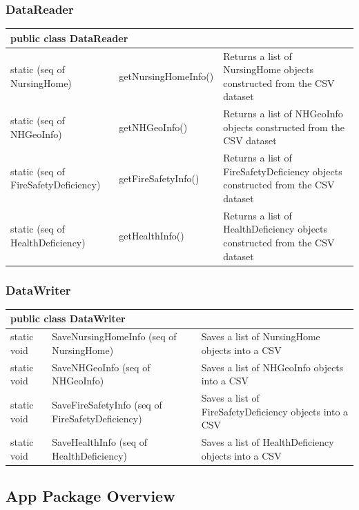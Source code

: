 \documentclass[12pt]{article}
\begin{document}
\newpage
\subsubsection{DataReader}
\begin{center}
\begin{tabular}{p{0.13\hsize}|p{0.25\hsize}|p{0.47\hsize}}
\multicolumn{3}{l}{\textbf{public class DataReader}} \\
\hline
static (seq of NursingHome) & getNursingHomeInfo() & Returns a list of NursingHome objects constructed from the CSV dataset\\
\hline
static (seq of NHGeoInfo) & getNHGeoInfo() & Returns a list of NHGeoInfo objects constructed from the CSV dataset\\
\hline
static (seq of FireSafetyDeficiency) & getFireSafetyInfo() & Returns a list of FireSafetyDeficiency objects constructed from the CSV dataset\\
\hline
static (seq of HealthDeficiency) & getHealthInfo() & Returns a list of HealthDeficiency objects constructed from the CSV dataset\\
\hline
\end{tabular}

\end{center}
\subsubsection{DataWriter}
\begin{center}
\begin{tabular}{p{0.13\hsize}|p{0.25\hsize}|p{0.47\hsize}}
\multicolumn{3}{l}{\textbf{public class DataWriter}} \\
\hline
static void & SaveNursingHomeInfo (seq of NursingHome) & Saves a list of NursingHome objects into a CSV\\
\hline
static void & SaveNHGeoInfo (seq of NHGeoInfo) & Saves a list of NHGeoInfo objects into a CSV\\
\hline
static void & SaveFireSafetyInfo (seq of FireSafetyDeficiency) & Saves a list of FireSafetyDeficiency objects into a CSV\\
\hline
static void & SaveHealthInfo (seq of HealthDeficiency) & Saves a list of HealthDeficiency objects into a CSV\\
\hline
\end{tabular}
\end{center}

\newpage
\subsection{App Package Overview}
\end{document}
